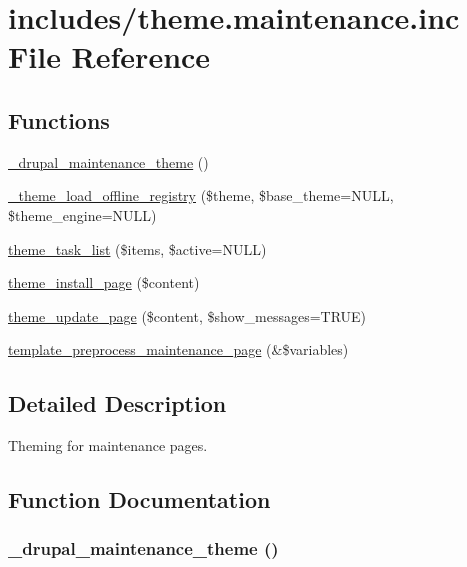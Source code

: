 \hypertarget{theme_8maintenance_8inc}{
\section{includes/theme.maintenance.inc File Reference}
\label{theme_8maintenance_8inc}
}
\subsection*{Functions}
\begin{CompactItemize}
\item 
\hyperlink{theme_8maintenance_8inc_8f521a6aba04fc11935a874df3ad9f05}{\_\-drupal\_\-maintenance\_\-theme} ()
\item 
\hyperlink{theme_8maintenance_8inc_7bf7a7faa37b3475038eca9a2ecf97e5}{\_\-theme\_\-load\_\-offline\_\-registry} (\$theme, \$base\_\-theme=NULL, \$theme\_\-engine=NULL)
\item 
\hyperlink{group__themeable_g83bdead8c42251faaf93ddc2480b9d7f}{theme\_\-task\_\-list} (\$items, \$active=NULL)
\item 
\hyperlink{theme_8maintenance_8inc_5f691f589f18990cce7f967be939172d}{theme\_\-install\_\-page} (\$content)
\item 
\hyperlink{theme_8maintenance_8inc_c6c65623ac5a4e2ba448b2df7a1ccd66}{theme\_\-update\_\-page} (\$content, \$show\_\-messages=TRUE)
\item 
\hyperlink{theme_8maintenance_8inc_14a92df5f5e74cebcf7fb680885e58a5}{template\_\-preprocess\_\-maintenance\_\-page} (\&\$variables)
\end{CompactItemize}


\subsection{Detailed Description}
Theming for maintenance pages. 

\subsection{Function Documentation}
\hypertarget{theme_8maintenance_8inc_8f521a6aba04fc11935a874df3ad9f05}{
\subsubsection[{\_\-drupal\_\-maintenance\_\-theme}]{\setlength{\rightskip}{0pt plus 5cm}\_\-drupal\_\-maintenance\_\-theme ()}}
\label{theme_8maintenance_8inc_8f521a6aba04fc11935a874df3ad9f05}


